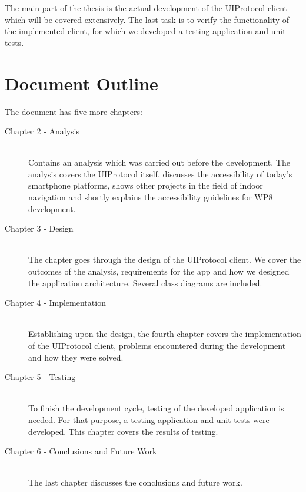The main part of the thesis is the actual development of the UIProtocol client which will be covered extensively. The last task is to verify the functionality of the implemented client, for which we developed a testing application and unit tests.

\section{Document Outline}
The document has five more chapters:

\begin{description}
  \item[Chapter 2 - Analysis] \hfill \\
  Contains an analysis which was carried out before the development. The analysis covers the UIProtocol itself, discusses the accessibility of today's smartphone platforms, shows other projects in the field of indoor navigation and shortly explains the accessibility guidelines for WP8 development.
  \item[Chapter 3 - Design] \hfill \\
  The chapter goes through the design of the UIProtocol client. We cover the outcomes of the analysis, requirements for the app and how we designed the application architecture. Several class diagrams are included.
  \item[Chapter 4 - Implementation] \hfill \\
  Establishing upon the design, the fourth chapter covers the implementation of the UIProtocol client, problems encountered during the development and how they were solved.
  \item[Chapter 5 - Testing] \hfill \\
  To finish the development cycle, testing of the developed application is needed. For that purpose, a testing application and unit tests were developed. This chapter covers the results of testing.
    \item[Chapter 6 - Conclusions and Future Work] \hfill \\
    The last chapter discusses the conclusions and future work.
\end{description}
